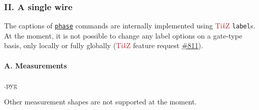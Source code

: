 \documentclass{scrartcl}
\makeatletter
\newenvironment{codeexample}{%
   \VerbatimEnvironment%
   \let\FVB@VerbatimOut\minted@FVB@VerbatimOut
   \let\FVE@VerbatimOut\minted@FVE@VerbatimOut
   \minted@configlang{tex}%
   \minted@fvset
   \begin{VerbatimOut}[codes={\catcode`\^^I=12},firstline,lastline]{\minted@jobname.pyg}%
}{
   \end{VerbatimOut}%
   \minted@langlinenoson%
   \savebox\codeexamplebox{ \minted@jobname.pyg}%
   \ifdim\wd\codeexamplebox>\dimexpr.5\linewidth-3mm\relax%
      \wd\codeexamplebox=.5\linewidth%
   \else%
      \wd\codeexamplebox=\dimexpr\wd\codeexamplebox+3mm\relax%
   \fi%
   \noindent\begin{minipage}{\wd\codeexamplebox}%
      \centering%
      \usebox\codeexamplebox%
   \end{minipage}%
   \begin{minipage}{\dimexpr\linewidth-\wd\codeexamplebox\relax}%
      \minted@pygmentize{\minted@lang}%
   \end{minipage}%
   \minted@langlinenosoff%
   \par%
}
\newenvironment{codeexample*}{%
   \VerbatimEnvironment%
   \let\FVB@VerbatimOut\minted@FVB@VerbatimOut
   \let\FVE@VerbatimOut\minted@FVE@VerbatimOut
   \minted@configlang{tex}%
   \minted@fvset
   \begin{VerbatimOut}[codes={\catcode`\^^I=12},firstline,lastline]{\minted@jobname.pyg}%
}{
   \end{VerbatimOut}%
   \minted@langlinenoson%
   \begin{adjustbox}{center}
       \minted@jobname.pyg %
   \end{adjustbox}\nopagebreak
   \minted@pygmentize{\minted@lang}%
   \minted@langlinenosoff%
   \par%
}
\def\TikZ{\textcolor{brown}{Ti\textit kZ}}
\def\gate#1{\hyperref[gate:#1]{\texttt{#1}}}
\makeatother
\begin{document}
         \subsubsection{II. A single wire}
            \begin{example}
               \begin{codeexample*}
               \end{codeexample*}
               The captions of \gate{phase} commands are internally implemented using \TikZ{} \texttt{label}s.
               At the moment, it is not possible to change any label options on a gate-type basis, only locally or fully globally (\TikZ{} feature request \href{https://github.com/pgf-tikz/pgf/issues/811}{\#811}).
            \end{example}

            \clearpage
            \paragraph{A. Measurements}\leavevmode
               \begin{example}
                  \begin{codeexample}
                  \end{codeexample}
                  Other measurement shapes are not supported at the moment.
               \end{example}
\end{document}
